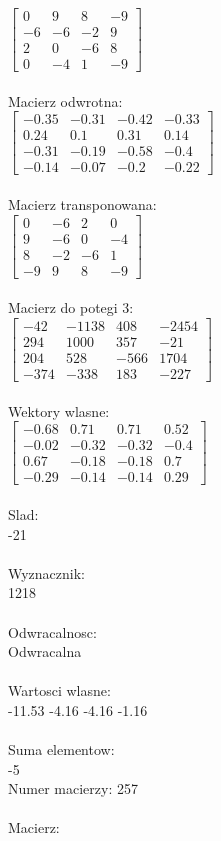 \documentclass[a4paper,12pt]{article}
\begin{document}
$\begin{bmatrix} 0&9&8&-9\\-6&-6&-2&9\\2&0&-6&8\\0&-4&1&-9 \end{bmatrix}$
\\
\\
Macierz odwrotna:\\

$\begin{bmatrix} -0.35&-0.31&-0.42&-0.33\\0.24&0.1&0.31&0.14\\-0.31&-0.19&-0.58&-0.4\\-0.14&-0.07&-0.2&-0.22 \end{bmatrix}$
\\
\\
Macierz transponowana:\\

$\begin{bmatrix} 0&-6&2&0\\9&-6&0&-4\\8&-2&-6&1\\-9&9&8&-9 \end{bmatrix}$
\\
\\
Macierz do potegi 3:\\

$\begin{bmatrix} -42&-1138&408&-2454\\294&1000&357&-21\\204&528&-566&1704\\-374&-338&183&-227 \end{bmatrix}$
\\
\\
Wektory wlasne:\\

$\begin{bmatrix} -0.68&0.71&0.71&0.52\\-0.02&-0.32&-0.32&-0.4\\0.67&-0.18&-0.18&0.7\\-0.29&-0.14&-0.14&0.29 \end{bmatrix}$
\\
\\
Slad:\\
-21
\\
\\
Wyznacznik:\\
1218
\\
\\
Odwracalnosc:\\
Odwracalna
\\
\\
Wartosci wlasne:\\
-11.53 -4.16 -4.16 -1.16
\\
\\
Suma elementow:\\
-5
\\
\newpage
Numer macierzy:
257
\\
\\
Macierz:\\
\end{document}
